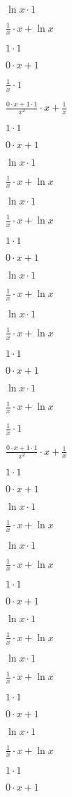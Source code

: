 $ \ln x \cdot 1$

$ \frac{1}{x}  \cdot x+ \ln x$

$1 \cdot 1$

$0 \cdot x+1$

$ \frac{1}{x}  \cdot 1$

$ \frac{0 \cdot x+1 \cdot 1}{x^{2}}  \cdot x+ \frac{1}{x} $

$1 \cdot 1$

$0 \cdot x+1$

$ \ln x \cdot 1$

$ \frac{1}{x}  \cdot x+ \ln x$

$ \ln x \cdot 1$

$ \frac{1}{x}  \cdot x+ \ln x$

$1 \cdot 1$

$0 \cdot x+1$

$ \ln x \cdot 1$

$ \frac{1}{x}  \cdot x+ \ln x$

$ \ln x \cdot 1$

$ \frac{1}{x}  \cdot x+ \ln x$

$1 \cdot 1$

$0 \cdot x+1$

$ \ln x \cdot 1$

$ \frac{1}{x}  \cdot x+ \ln x$

$ \frac{1}{x}  \cdot 1$

$ \frac{0 \cdot x+1 \cdot 1}{x^{2}}  \cdot x+ \frac{1}{x} $

$1 \cdot 1$

$0 \cdot x+1$

$ \ln x \cdot 1$

$ \frac{1}{x}  \cdot x+ \ln x$

$ \ln x \cdot 1$

$ \frac{1}{x}  \cdot x+ \ln x$

$1 \cdot 1$

$0 \cdot x+1$

$ \ln x \cdot 1$

$ \frac{1}{x}  \cdot x+ \ln x$

$ \ln x \cdot 1$

$ \frac{1}{x}  \cdot x+ \ln x$

$1 \cdot 1$

$0 \cdot x+1$

$ \ln x \cdot 1$

$ \frac{1}{x}  \cdot x+ \ln x$

$1 \cdot 1$

$0 \cdot x+1$

